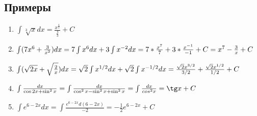\documentclass[12pt,a4paper]{article}
\begin{document}
\subsection{Примеры}
\begin{enumerate}[label=(\roman*), leftmargin=*, itemsep=0.4ex, before={\everymath{\displaystyle}}]%
\item{
$\int \sqrt[3]{x} dx = \frac{x^{\frac{4}{3}}}{\frac{4}{3}} + C$
}
\item{
$
\int (7x^6 + \frac{3}{x^2})dx = 7 \int x^6 dx + 3 \int x^{-2} dx
= 7 * \frac{x^7}{7} + 3 * \frac{x^{-1}}{-1} + C =\\ x^7 - \frac{3}{x} + C
$
}
\item{
$
\int (\sqrt{2x} + \sqrt{\frac{2}{x}})dx = \sqrt{2} \int x^{1/2}dx +
\sqrt{2} \int x^{-1/2}dx =\\ \frac{\sqrt{2} x^{3/2}}{3/2} +
\frac{\sqrt{2} x^{1/2}}{1/2} + C
$
}
\item{
$\int \frac{dx}{\cos 2x + \sin^2 x} =
\int \frac{dx}{\cos^2 x - \sin^2 x + \sin^2 x} =
\int \frac{dx}{cos^2 x} =
\tg x + C$
}
\item{
$
\int e^{6 - 2x} dx =
\int \frac{e^{6 - 2x}d(6 - 2x)}{-2} =
-\frac{1}{2} e^{6 - 2x} + C
$
}
\end{enumerate}
\end{document}
